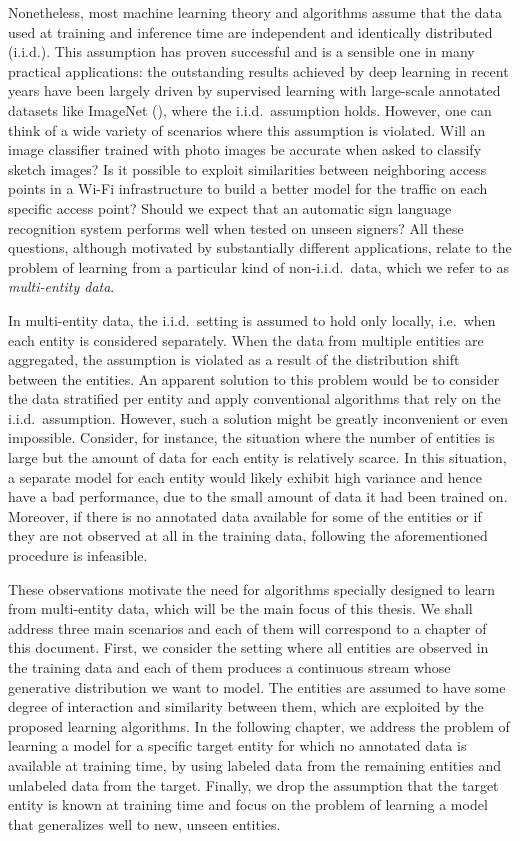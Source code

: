 Nonetheless, most machine learning theory and algorithms assume that the data used at training and inference time are independent and identically distributed (i.i.d.). This assumption has proven successful and is a sensible one in many practical applications: the outstanding results achieved by deep learning in recent years have
been largely driven by supervised learning with large-scale
annotated datasets like ImageNet (\citet{Deng2009}), where the i.i.d.\ assumption holds. However, one can think of a wide variety of scenarios where this assumption is violated. Will an image classifier trained with photo images be accurate when asked to classify sketch images? Is it possible to exploit similarities between neighboring access points in a Wi-Fi infrastructure to build a better model for the traffic on each specific access point? Should we expect that an automatic sign language recognition system performs well when tested on unseen signers? All these questions, although motivated by substantially different applications, relate to the problem of learning from a particular kind of non-i.i.d.\ data, which we refer to as \emph{multi-entity data}.

In multi-entity data, the i.i.d.\ setting is assumed to hold only locally, i.e.\ when each entity is considered separately. When the data from multiple entities are aggregated, the assumption is violated as a result of the distribution shift between the entities. An apparent solution to this problem would be to consider the data stratified per entity and apply conventional algorithms that rely on the i.i.d.\ assumption. However, such a solution might be greatly inconvenient or even impossible. Consider, for instance, the situation where the number of entities is large but the amount of data for each entity is relatively scarce. In this situation, a separate model for each entity would likely exhibit high variance and hence have a bad performance, due to the small amount of data it had been trained on. Moreover, if there is no annotated data available for some of the entities or if they are not observed at all in the training data, following the aforementioned procedure is infeasible.

These observations motivate the need for algorithms specially designed to learn from multi-entity data, which will be the main focus of this thesis. We shall address three main scenarios and each of them will correspond to a chapter of this document. First, we consider the setting where all entities are observed in the training data and each of them produces a continuous stream whose generative distribution we want to model. The entities are assumed to have some degree of interaction and similarity between them, which are exploited by the proposed learning algorithms. In the following chapter, we address the problem of learning a model for a specific target entity for which no annotated data is available at training time, by using labeled data from the remaining entities and unlabeled data from the target. Finally, we drop the assumption that the target entity is known at training time and focus on the problem of learning a model that generalizes well to new, unseen entities.

